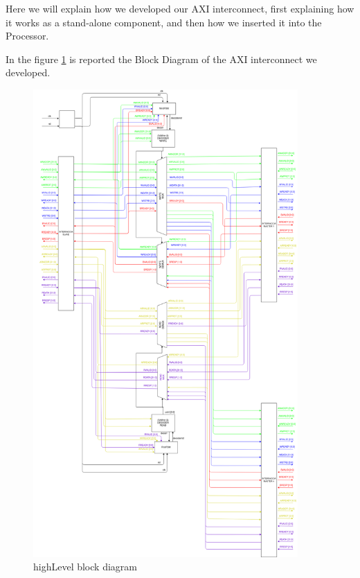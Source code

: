 Here we will explain how we developed our AXI interconnect, first explaining how it works as a stand-alone component, and then how we inserted it into the Processor.


{}
In the figure \ref{HLBD} is reported the Block Diagram of the AXI interconnect we developed.

\begin{figure}[h]
  \includegraphics[width=0.9\textwidth, angle=0]{"./../../img/Images/highLevel.png"}
  \caption{highLevel block diagram}
  \label{HLBD}
\end{figure}

